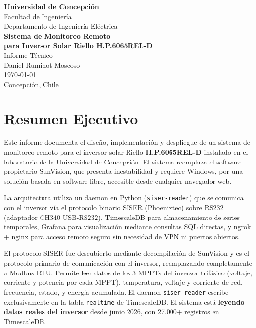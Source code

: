 \documentclass[12pt,a4paper]{article}
\begin{document}
\begin{titlepage}
    \centering
    \vspace*{2cm}
    {\Huge\bfseries Universidad de Concepci\'on}\\[1cm]
    {\Large Facultad de Ingenier\'ia\\Departamento de Ingenier\'ia El\'ectrica}\\[2cm]

    {\Huge\bfseries Sistema de Monitoreo Remoto\\para Inversor Solar Riello H.P.6065REL-D}\\[1cm]
    {\Large Informe T\'ecnico}\\[2cm]

    {\large Daniel Ruminot Moscoso}\\[2cm]

    {\large \today}\\[1cm]
    {\large Concepci\'on, Chile}
\end{titlepage}

\tableofcontents
\newpage

\section{Resumen Ejecutivo}

Este informe documenta el dise\~no, implementaci\'on y despliegue de un sistema de monitoreo remoto para el inversor solar Riello \textbf{H.P.6065REL-D} instalado en el laboratorio de la Universidad de Concepci\'on. El sistema reemplaza el software propietario SunVision, que presenta inestabilidad y requiere Windows, por una soluci\'on basada en software libre, accesible desde cualquier navegador web.

La arquitectura utiliza un daemon en Python (\texttt{siser-reader}) que se comunica con el inversor v\'ia el protocolo binario SISER (Phoenixtec) sobre RS232 (adaptador CH340 USB-RS232), TimescaleDB para almacenamiento de series temporales, Grafana para visualizaci\'on mediante consultas SQL directas, y ngrok + nginx para acceso remoto seguro sin necesidad de VPN ni puertos abiertos.

El protocolo SISER fue descubierto mediante decompilaci\'on de SunVision y es el protocolo primario de comunicaci\'on con el inversor, reemplazando completamente a Modbus RTU. Permite leer datos de los 3 MPPTs del inversor trif\'asico (voltaje, corriente y potencia por cada MPPT), temperatura, voltaje y corriente de red, frecuencia, estado, y energ\'ia acumulada. El daemon \texttt{siser-reader} escribe exclusivamente en la tabla \texttt{realtime} de TimescaleDB. El sistema est\'a \textbf{leyendo datos reales del inversor} desde junio 2026, con 27.000+ registros en TimescaleDB.
\end{document}
